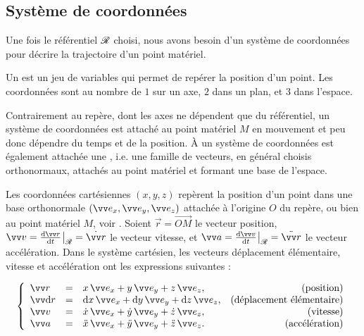 \documentclass[12pt,fancy]{cours}
\begin{document}
%
%
\subsection{Système de coordonnées}

Une fois le référentiel $\mathcal{R}$ choisi, nous avons besoin d'un système de coordonnées pour décrire la trajectoire d'un point matériel.

\begin{definition}\label{def:galile}
Un  est un jeu de variables qui permet de repérer la position d’un point. Les coordonnées sont au nombre de $1$ sur un axe, $2$ dans un plan, et $3$ dans l’espace.
\end{definition}

Contrairement au repère, dont les axes ne dépendent que du référentiel, un système de coordonnées est attaché au point matériel $M$ en mouvement et peu donc dépendre du temps et de la position. À un système de coordonnées est également attachée une , i.e. une famille de vecteurs, en général choisis orthonormaux, attachés au point matériel et formant une base de l’espace.


Les coordonnées cartésiennes $(x,y,z)$ repèrent la position d’un point dans une base orthonormale $(\ex, \ey, \ez)$ attachée à l’origine $O$ du repère, ou bien au point matériel $M$, voir . Soient $\Vec{r}=\Vec{OM}$ le vecteur position, $\Vec{v} = \dR{\Vec{r}}{t}{\Rcal} = \dot{\Vec{r}}$ le vecteur vitesse, et $\Vec{a} = \dR{\Vec{v}}{t}{\Rcal} = \ddot{\Vec{r}}$ le vecteur accélération. Dans le système cartésien, les vecteurs déplacement élémentaire, vitesse et accélération ont les expressions suivantes :

\begin{equation}
\left\{
\begin{array}{lllr}
\Vec{r} & = & x\,\ex+y\,\ey+z\,\ez, & \text{(position)} \\
\Vec{\d r} & = & \d x\,\ex+\d y\,\ey+\d z\,\ez, & \text{(déplacement élémentaire)} \\
\Vec{v} & = & \dot{x}\,\ex+\dot{y}\,\ey+\dot{z}\,\ez, & \text{(vitesse)}  \\
\Vec{a} & = & \ddot{x}\,\ex+\ddot{y}\,\ey+\ddot{z}\,\ez. & \text{(accélération)}
\end{array}
\right.
\end{equation}
\end{document}
